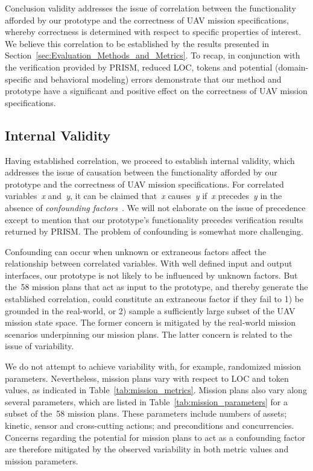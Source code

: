 Conclusion validity addresses the issue of correlation between the functionality afforded by our prototype and the correctness of UAV mission specifications, whereby correctness is determined with respect to specific properties of interest. We believe this correlation to be established by the results presented in Section~\ref{sec:Evaluation_Methods_and_Metrics}. To recap, in conjunction with the verification provided by PRISM, reduced LOC, tokens and potential (domain-specific and behavioral modeling) errors demonstrate that our method and prototype have a significant and positive effect on the correctness of UAV mission specifications.

\subsection{Internal Validity}

Having established correlation, we proceed to establish internal validity, which addresses the issue of causation between the functionality afforded by our prototype and the correctness of UAV mission specifications. For correlated variables~\emph{x} and~\emph{y}, it can be claimed that~\emph{x} causes~\emph{y} if~\emph{x} precedes~\emph{y} in the absence of \emph{confounding factors}~\cite{Seltman_2013}. We will not elaborate on the issue of precedence except to mention that our prototype's functionality precedes verification results returned by PRISM\@. The problem of confounding is somewhat more challenging.

Confounding can occur when unknown or extraneous factors affect the relationship between correlated variables. With well defined input and output interfaces, our prototype is not likely to be influenced by unknown factors. But the~58 mission plans that act as input to the prototype, and thereby generate the established correlation, could constitute an extraneous factor if they fail to 1) be grounded in the real-world, or 2) sample a sufficiently large subset of the UAV mission state space. The former concern is mitigated by the real-world mission scenarios underpinning our mission plans. The latter concern is related to the issue of variability.

We do not attempt to achieve variability with, for example, randomized mission parameters. Nevertheless, mission plans vary with respect to LOC and token values, as indicated in Table~\ref{tab:mission_metrics}. Mission plans also vary along several parameters, which are listed in Table~\ref{tab:mission_parameters} for a subset of the~58 mission plans. These parameters include numbers of assets; kinetic, sensor and cross-cutting actions; and preconditions and concurrencies. Concerns regarding the potential for mission plans to act as a confounding factor are therefore mitigated by the observed variability in both metric values and mission parameters.

